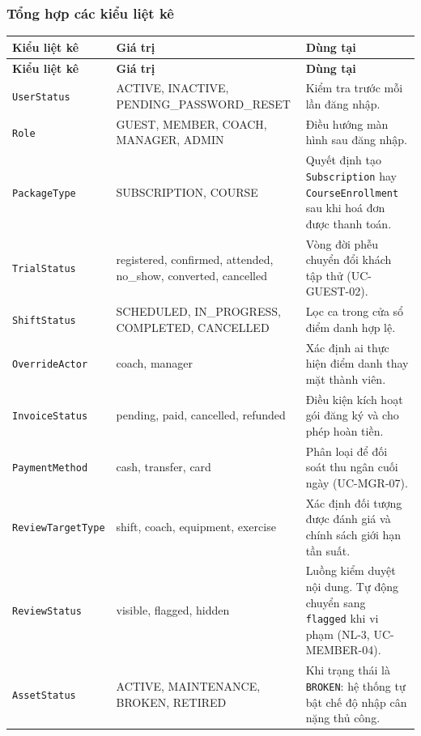 \newpage
\subsubsection{Tổng hợp các kiểu liệt kê}

\begingroup
\renewcommand{\arraystretch}{1.3}
\begin{longtable}{|>{\centering\arraybackslash}m{3.5cm}|>{\ttfamily\raggedright\arraybackslash}m{5.5cm}|>{\raggedright\arraybackslash}m{5cm}|}
\hline
\textbf{Kiểu liệt kê} & \normalfont\textbf{Giá trị} & \textbf{Dùng tại} \\ \hline
\endfirsthead
\hline
\textbf{Kiểu liệt kê} & \normalfont\textbf{Giá trị} & \textbf{Dùng tại} \\ \hline
\endhead
\hline
\endfoot

\texttt{UserStatus} &
  ACTIVE, INACTIVE, PENDING\_PASSWORD\_RESET &
  Kiểm tra trước mỗi lần đăng nhập. \\ \hline

\texttt{Role} &
  GUEST, MEMBER, COACH, MANAGER, ADMIN &
  Điều hướng màn hình sau đăng nhập. \\ \hline

\texttt{PackageType} &
  SUBSCRIPTION, COURSE &
  Quyết định tạo \texttt{Subscription} hay \texttt{CourseEnrollment}
  sau khi hoá đơn được thanh toán. \\ \hline

\texttt{TrialStatus} &
  registered, confirmed, attended, no\_show, converted, cancelled &
  Vòng đời phễu chuyển đổi khách tập thử (UC-GUEST-02). \\ \hline

\texttt{ShiftStatus} &
  SCHEDULED, IN\_PROGRESS, COMPLETED, CANCELLED &
  Lọc ca trong cửa sổ điểm danh hợp lệ. \\ \hline

\texttt{OverrideActor} &
  coach, manager &
  Xác định ai thực hiện điểm danh thay mặt thành viên. \\ \hline

\texttt{InvoiceStatus} &
  pending, paid, cancelled, refunded &
  Điều kiện kích hoạt gói đăng ký và cho phép hoàn tiền. \\ \hline

\texttt{PaymentMethod} &
  cash, transfer, card &
  Phân loại để đối soát thu ngân cuối ngày (UC-MGR-07). \\ \hline

\texttt{ReviewTargetType} &
  shift, coach, equipment, exercise &
  Xác định đối tượng được đánh giá và chính sách giới hạn tần suất. \\ \hline

\texttt{ReviewStatus} &
  visible, flagged, hidden &
  Luồng kiểm duyệt nội dung. Tự động chuyển sang \texttt{flagged}
  khi vi phạm (NL-3, UC-MEMBER-04). \\ \hline

\texttt{AssetStatus} &
  ACTIVE, MAINTENANCE, BROKEN, RETIRED &
  Khi trạng thái là \texttt{BROKEN}: hệ thống tự bật chế độ
  nhập cân nặng thủ công. \\ \hline

\end{longtable}
\endgroup

